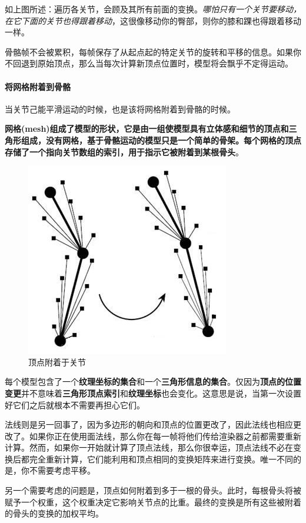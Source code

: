 \documentclass[UTF8,a4paper,12pt]{ctexbook}
\begin{document}
				如上图所述：遍历各关节，会顾及其所有前面的变换。\textit{哪怕只有一个关节要移动，在它下面的关节也得跟着移动}，这很像移动你的臀部，则你的膝和踝也得跟着移动一样。
				
				骨骼帧不会被累积，每帧保存了从起点起的特定关节的旋转和平移的信息。如果你不回退到原始顶点，那么当每次计算新顶点位置时，模型将会飘乎不定得运动。
			
			\paragraph{将网格附着到骨骼}
				当关节己能平滑运动的时候，也是该将网格附着到骨骼的时候。
				
				\textbf{网格(mesh)组成了模型的形状，它是由一组使模型具有立体感和细节的顶点和三角形组成，没有网格，基于骨骼运动的模型只是一个简单的骨架。每个网格的顶点存储了一个指向关节数组的索引，用于指示它被附着到某根骨头}。
					\begin{figure}[H]
						\centering
						\includegraphics[width=.6\linewidth]{SkeletonTheory05}
						\caption{顶点附着于关节}
					\end{figure}
				
				每个模型包含了一个\textbf{纹理坐标的集合}和一个\textbf{三角形信息的集合}。仅因为\textbf{顶点的位置变更}并不意味着\textbf{三角形顶点索引}和\textbf{纹理坐标}也会变化。这意思是说，当第一次设置好它们之后就根本不需要再担心它们。
				
				法线则是另一回事了，因为多边形的朝向和顶点的位置更改了，因此法线也相应更改了。如果你正在使用面法线，那么你在每一帧将他们传给渲染器之前都需要重新计算。然而，如果你一开始就计算了顶点法线，那么你很幸运，顶点法线不必在变换后都完全重新计算，它们能利用和顶点相同的变换矩阵来进行变换。唯一不同的是，你不需要考虑平移。
				
				另一个需要考虑的问题是，顶点如何附着到多于一根的骨头。此时，每根骨头将被赋予一个权重，这个权重决定它影响关节点的比重。最终的变换是所有这些被附着的骨头的变换的加权平均。
	
\end{document}
